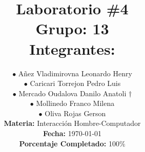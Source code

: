 
\newcommand{\NumeroLaboratorio}{4}		%
\newcommand{\PorcentajeCompletado}{100}	%





\title{
\hspace{-0.1cm}\LARGE{Laboratorio \#\NumeroLaboratorio} \\\vspace{0.05cm}
{\large Grupo: 13} \\\vspace{0.2cm}
{\large Integrantes:} \\\vspace{0.2cm}
}

\author{
\hspace{0.5cm}$\bullet$ Añez Vladimirovna Leonardo Henry\\
\hspace{0.5cm}$\bullet$ Caricari Torrejon Pedro Luis\\
\hspace{0.5cm}$\bullet$ Mercado Oudalova Danilo Anatoli $\dagger$\\
\hspace{0.5cm}$\bullet$ Mollinedo Franco Milena\\
\hspace{0.5cm}$\bullet$ Oliva Rojas Gerson \\\vspace{0.2cm}
\textbf{Materia:} Interacción Hombre-Computador \\\vspace{0.2cm}
\textbf{Fecha:} \today \\\vspace{0.2cm}
\textbf{Porcentaje Completado:} \PorcentajeCompletado$\%$
}
\maketitle